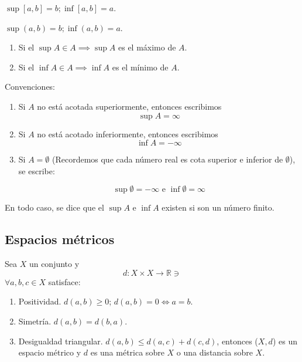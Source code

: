 \begin{ejemplo}
\item $\sup[a,b]=b; \inf[a,b]=a$. 
\item $\sup (a,b)=b; \inf(a,b)=a$. 
\end{ejemplo}

\begin{nota}
	\begin{enumerate}
		\item Si el $\sup A\in A\implies \sup A$ es el máximo de $A$. 
		\item Si el $\inf A\in A\implies \inf A$ es el mínimo de $A$. 
	\end{enumerate}
\end{nota}

\begin{cajita}
	Convenciones: 
	\begin{enumerate}
		\item Si $A$ no está acotada superiormente, entonces escribimos
	$$\sup A=\infty$$
\item Si $A$ no está acotado inferiormente, entonces escribimos 
$$\inf A=-\infty$$	
\item Si $A=\emptyset$ (Recordemos que cada número real es cota superior e inferior de $\emptyset$), se escribe: 

$$\sup \emptyset =-\infty \text{ e } \inf \emptyset = \infty$$
\end{enumerate}
\end{cajita}

\begin{nota}
	En todo caso, se dice que el $\sup A$ e $\inf A$ existen si son un número finito. 
\end{nota}

\subsection{Espacios métricos}

\begin{definicion}
	Sea $X$ un conjunto y 
	$$d: X\times X\to \mathbb{R} \ni$$
	$\forall a,b,c\in X$ satisface: 
	\begin{enumerate}
		\item Positividad. $d(a,b)\geq 0$; $d(a,b)=0\iff a=b$. 
		\item Simetría. $d(a,b)=d(b,a)$. 
		\item Desigualdad triangular. $d(a,b)\leq d(a,c)+d(c,d)$, entonces ($X,d$) es un espacio métrico y $d$ es una métrica sobre $X$ o una distancia sobre $X$. 	\end{enumerate}
\end{definicion}


